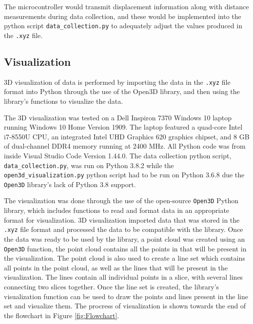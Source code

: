 \documentclass[12pt]{article}
\begin{document}
The microcontroller would transmit displacement information along with distance measurements during data collection, and these would be implemented into the python script \texttt{data\_collection.py} to adequately adjust the values produced in the \texttt{.xyz} file.
\subsection*{Visualization}
\indent \indent 3D visualization of data is performed by importing the data in the \texttt{.xyz} file format into Python through the use of the Open3D library, and then using the library's functions to visualize the data. 

The 3D visualization was tested on a Dell Inspiron 7370 Windows 10 laptop running Windows 10 Home Version 1909. The laptop featured a quad-core Intel i7-8550U CPU, an integrated Intel UHD Graphics 620 graphics chipset, and 8 GB of dual-channel DDR4 memory running at 2400 MHz. All Python code was from inside Visual Studio Code Version 1.44.0. The data collection python script, \texttt{data\_collection.py}, was run on Python 3.8.2 while the \texttt{open3d\_visualization.py} python script had to be run on Python 3.6.8 due the \texttt{Open3D} library's lack of Python 3.8 support.

The visualization was done through the use of the open-source \texttt{Open3D} Python library, which includes functions to read and format data in an appropriate format for visualization. 3D visualization imported data that was stored in the \texttt{.xyz} file format and processed the data to be compatible with the library. Once the data was ready to be used by the library, a point cloud was created using an \texttt{Open3D} function, the point cloud contains all the points in that will be present in the visualization. The point cloud is also used to create a line set which contains all points in the point cloud, as well as the lines that will be present in the visualization. The lines contain all individual points in a slice, with several lines connecting two slices together. Once the line set is created, the library's visualization function can be used to draw the points and lines present in the line set and visualize them. The procress of visualization is shown towards the end of the flowchart in Figure \ref{fig:Flowchart}.
\end{document}
